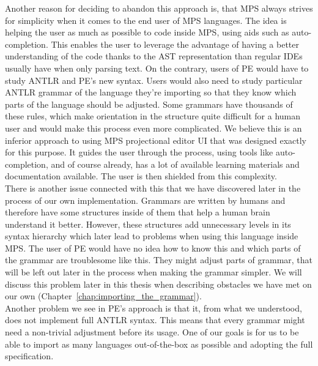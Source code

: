 Another reason for deciding to abandon this approach is, that MPS always strives for simplicity when it comes to the end user of MPS languages.
The idea is helping the user as much as possible to code inside MPS, using aids such as auto-completion.
This enables the user to leverage the advantage of having a better understanding of the code thanks to the AST representation than regular IDEs usually have when only parsing text.
On the contrary, users of PE would have to study ANTLR and PE's new syntax.
Users would also need to study particular ANTLR grammar of the language they're importing so that they know which parts of the language should be adjusted.
Some grammars have thousands of these rules, which make orientation in the structure quite difficult for a human user and would make this process even more complicated.
We believe this is an inferior approach to using MPS projectional editor UI that was designed exactly for this purpose.
It guides the user through the process, using tools like auto-completion, and of course already, has a lot of available learning materials and documentation available.
The user is then shielded from this complexity.
\\

There is another issue connected with this that we have discovered later in the process of our own implementation.
Grammars are written by humans and therefore have some structures inside of them that help a human brain understand it better.
However, these structures add unnecessary levels in its syntax hierarchy which later lead to problems when using this language inside MPS.
The user of PE would have no idea how to know this and which parts of the grammar are troublesome like this.
They might adjust parts of grammar, that will be left out later in the process when making the grammar simpler.
We will discuss this problem later in this thesis when describing obstacles we have met on our own (Chapter~\ref{chap:importing_the_grammar}).
\\

Another problem we see in PE's approach is that it, from what we understood, does not implement full ANTLR syntax.
This means that every grammar might need a non-trivial adjustment before its usage.
One of our goals is for us to be able to import as many languages out-of-the-box as possible and adopting the full specification.
\\

